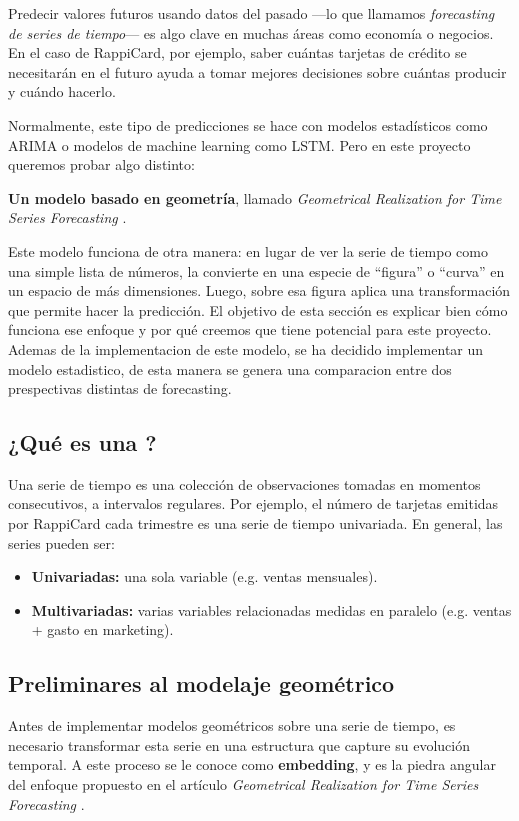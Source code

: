 Predecir valores futuros usando datos del pasado —lo que llamamos \textit{forecasting de series de tiempo}— es algo clave en muchas áreas como economía o negocios. En el caso de RappiCard, por ejemplo, saber cuántas tarjetas de crédito se necesitarán en el futuro ayuda a tomar mejores decisiones sobre cuántas producir y cuándo hacerlo.

Normalmente, este tipo de predicciones se hace con modelos estadísticos como ARIMA o modelos de machine learning como LSTM. Pero en este proyecto queremos probar algo distinto:

\textbf{Un modelo basado en geometría}, llamado \textit{Geometrical Realization for Time Series Forecasting} \cite{bayeh2024gr}.

Este modelo funciona de otra manera: en lugar de ver la serie de tiempo como una simple lista de números, la convierte en una especie de “figura” o “curva” en un espacio de más dimensiones. Luego, sobre esa figura aplica una transformación que permite hacer la predicción. El objetivo de esta sección es explicar bien cómo funciona ese enfoque y por qué creemos que tiene potencial para este proyecto. Ademas de la implementacion de este modelo, se ha decidido implementar un modelo estadistico, de esta manera se genera una comparacion entre dos prespectivas distintas de forecasting.

\subsection*{¿Qué es una ?}
Una serie de tiempo es una colección de observaciones tomadas en momentos consecutivos, a intervalos regulares. Por ejemplo, el número de tarjetas emitidas por RappiCard cada trimestre es una serie de tiempo univariada. En general, las series pueden ser:

\begin{itemize}
    \item \textbf{Univariadas:} una sola variable (e.g. ventas mensuales).
    \item \textbf{Multivariadas:} varias variables relacionadas medidas en paralelo (e.g. ventas + gasto en marketing).
\end{itemize}

\subsection*{Preliminares al modelaje geométrico}

Antes de implementar modelos geométricos sobre una serie de tiempo, es necesario transformar esta serie en una estructura que capture su evolución temporal. A este proceso se le conoce como \textbf{embedding}, y es la piedra angular del enfoque propuesto en el artículo \textit{Geometrical Realization for Time Series Forecasting} \cite{bayeh2024gr}.

